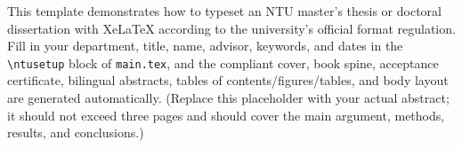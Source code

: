 \begin{abstractEN}
This template demonstrates how to typeset an NTU master's thesis or doctoral
dissertation with XeLaTeX according to the university's official format
regulation. Fill in your department, title, name, advisor, keywords, and dates
in the \texttt{\textbackslash ntusetup} block of \texttt{main.tex}, and the
compliant cover, book spine, acceptance certificate, bilingual abstracts,
tables of contents/figures/tables, and body layout are generated automatically.
(Replace this placeholder with your actual abstract; it should not exceed three
pages and should cover the main argument, methods, results, and conclusions.)
\end{abstractEN}
